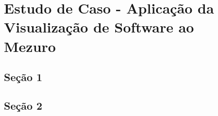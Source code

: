 \chapter[Estudo de Caso - Aplicação da Visualização de Software ao Mezuro]{Estudo de Caso - Aplicação da Visualização de Software ao Mezuro}

\section{Seção 1}

\section{Seção 2}